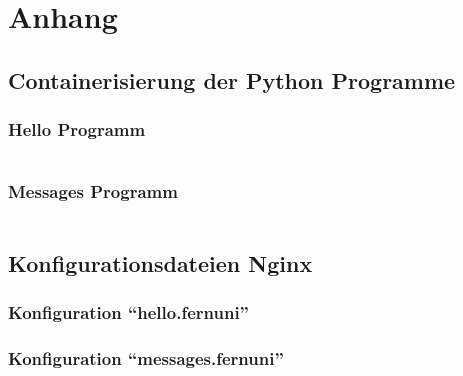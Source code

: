 \section{Anhang}

\subsection{Containerisierung der Python Programme}

\subsubsection{Hello Programm}

\inputminted[fontfamily=tt,
linenos=true,
numberblanklines=true,
numbersep=5pt,
gobble=0,
frame=leftline,
framerule=0.4pt,
framesep=2mm,
funcnamehighlighting=true,
tabsize=4,
obeytabs=false,
mathescape=false
samepage=false, %
showspaces=false,
showtabs =false,
texcl=false,
breaklines=true]{docker}{code/docker/hello/Dockerfile}

\subsubsection{Messages Programm}
\inputminted[fontfamily=tt,
linenos=true,
numberblanklines=true,
numbersep=5pt,
gobble=0,
frame=leftline,
framerule=0.4pt,
framesep=2mm,
funcnamehighlighting=true,
tabsize=4,
obeytabs=false,
mathescape=false
samepage=false, %
showspaces=false,
showtabs =false,
texcl=false,
breaklines=true]{docker}{code/docker/messages/Dockerfile}

\subsection{Konfigurationsdateien Nginx}\label{kap:nginx}

\subsubsection{Konfiguration \enquote{hello.fernuni}}

\subsubsection{Konfiguration \enquote{messages.fernuni}}

